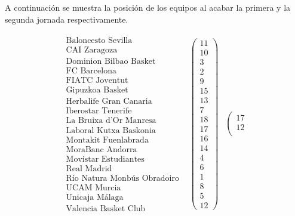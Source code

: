 \begin{ejem} A continuación se muestra la posición de los equipos al acabar la primera y la segunda jornada respectivamente.
\end{ejem}
\[
\begin{array}{ccc} 
\begin{array}{c}
\text{Baloncesto Sevilla}\\
\text{CAI Zaragoza} \\
\text{Dominion Bilbao Basket} \\
\text{FC Barcelona} \\
\text{FIATC Joventut} \\
\text{Gipuzkoa Basket} \\
\text{Herbalife Gran Canaria} \\
\text{Iberostar Tenerife} \\
\text{La Bruixa d'Or Manresa} \\
\text{Laboral Kutxa Baskonia} \\
\text{Montakit Fuenlabrada} \\
\text{MoraBanc Andorra} \\
\text{Movistar Estudiantes} \\
\text{Real Madrid} \\
\text{Río Natura Monbús Obradoiro} \\
\text{UCAM Murcia} \\
\text{Unicaja Málaga} \\
\text{Valencia Basket Club}
\end{array} & \left(\begin{array}{c}
11\\
10\\
3\\
2\\
9\\
15\\
13\\
7\\
18\\
17\\
16\\
14\\
4\\
6\\
1\\
8\\
5\\
12
\end{array} \right) & \left(\begin{array}{c}
17\\
12\\

\end{array}
\end{array}\]
